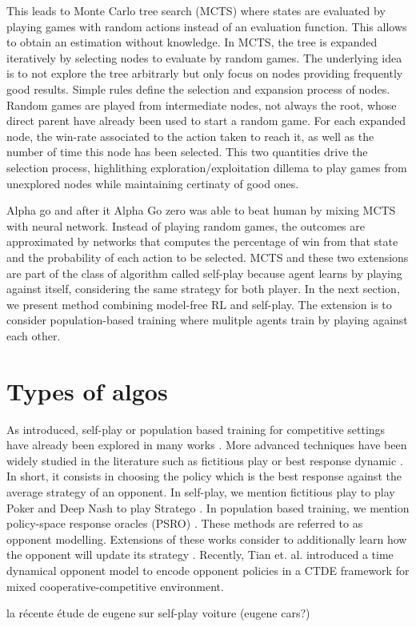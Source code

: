 This leads to Monte Carlo tree search (MCTS) where states are evaluated by playing games with random actions instead of an evaluation function.
This allows to obtain an estimation without knowledge.
In MCTS, the tree is expanded iteratively by selecting nodes to evaluate by random games.
The underlying idea is to not explore the tree arbitrarly but only focus on nodes providing frequently good results.
Simple rules define the selection and expansion process of nodes.
Random games are played from intermediate nodes, not always the root, whose direct parent have already been used to start a random game.
For each expanded node, the win-rate associated to the action taken to reach it, as well as the number of time this node has been selected.
This two quantities drive the selection process, highlithing exploration/exploitation dillema to play games from unexplored nodes while maintaining certinaty of good ones.

Alpha go \citep{silver2016mastering} and after it Alpha Go zero \citep{silver2017mastering} was able to beat human by mixing MCTS with neural network.
Instead of playing random games, the outcomes are approximated by networks that computes the percentage of win from that state and the probability of each action to be selected.
MCTS and these two extensions are part of the class of algorithm called self-play because agent learns by playing against itself, considering the same strategy for both player.
In the next section, we present method combining model-free RL and self-play.
The extension is to consider population-based training where mulitple agents train by playing against each other.

\section{Types of algos}\label{sec:ch6_algo}

As introduced, self-play or population based training for competitive settings have already been explored in many works \citep{jaderberg2019human, vinyals2019grandmaster, baker2019emergent}.
More advanced techniques have been widely studied in the literature such as fictitious play \cite{brown1951iterative} or best response dynamic \citep{baudin2022fictitious}.
In short, it consists in choosing the policy which is the best response against the average strategy of an opponent.
In self-play, we mention fictitious play to play Poker \citep{pmlr-v37-heinrich15} and Deep Nash to play Stratego \citep{DM_stratego}.
In population based training, we mention policy-space response oracles (PSRO) \citep{NIPS2017_3323fe11, Muller2020A}.
These methods are referred to as opponent modelling.
Extensions of these works consider to additionally learn how the opponent will update its strategy \citep{he2016opponent, foerster2017learning}.
Recently, Tian et. al. \citep{tian2022multi} introduced a time dynamical opponent model to encode opponent policies in a CTDE framework for mixed cooperative-competitive environment.

la récente étude de eugene sur self-play voiture (eugene cars?)
